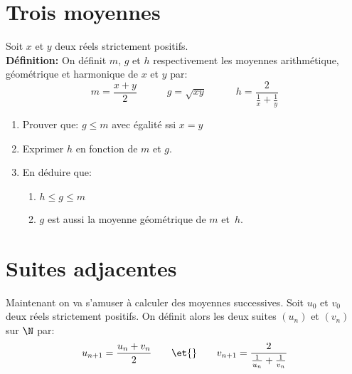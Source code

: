 \documentclass[a4paper]{article}
\begin{document}
\cfoot{}\lfoot{}
\section{Trois moyennes}
 Soit $x$ et $y$ deux r\'eels strictement positifs.\\
{\bf D\'efinition:} On d\'efinit $m$, $g$ et $h$ respectivement les moyennes arithm\'etique, g\'eom\'etrique et
harmonique de $x$ et $y$ par:
\[ m=\frac{x+y}{2}\qquad \quad g=\sqrt{xy}\qquad \quad h=\frac{2}{\frac{1}{x}+\frac{1}{y}}\]
\begin{enumerate}
\item Prouver que: $g\leq m$ avec \'egalit\'e ssi $x=y$
\item Exprimer $h$ en fonction de $m$ et $g$.
\item En d\'eduire que: 
  \begin{enumerate}
  \item $h\leq g\leq m$
  \item $g$ est aussi la moyenne  g\'eom\'etrique de $m$ et~$h$.
  \end{enumerate}
\end{enumerate}

\section{Suites adjacentes}
Maintenant on va s'amuser \`a calculer des moyennes successives. Soit
$u_0$ et $v_0$ deux r\'eels strictement positifs. On d\'efinit alors les
deux suites $(u_n)$ et $(v_n)$ sur $\N$ par:
\[ u_{n+1}=\frac{u_n+v_n}{2} \qquad \et{} \qquad v_{n+1}=\frac{2}{\frac{1}{u_n}+\frac{1}{v_n}}\]
\end{document}
